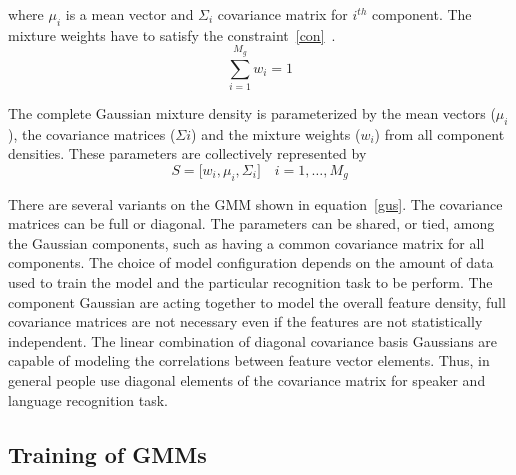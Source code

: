 \begin{spacing}{1.5}
where $\mu_{i}$ is a mean vector and $\Sigma_{i}$ covariance matrix for $i^{th}$ component. The mixture weights have to satisfy the constraint~\ref{con}~\cite{reynolds1995speaker}.
\begin{equation}
\label{con}
 \sum_{i=1}^{M_{g}}w_{i}=1
\end{equation}
 
 The complete Gaussian mixture density is parameterized by the mean vectors ($\mu_{i}$), the covariance matrices ($\Sigma{i}$) and the mixture weights ($w_{i}$) from all component densities. These parameters are collectively represented by
\begin{equation}
\label{gus}
 S= \bigg[w_{i},\mu_{i}, \Sigma_{i} \bigg] \quad i=1,\ldots, M_{g}
\end{equation}

There are several variants on the GMM shown in equation~\ref{gus}. The covariance matrices can be full or diagonal. The parameters can be shared, or tied, among the Gaussian components, such as having a common covariance matrix for all components. The choice of model configuration depends on the amount of data used to train the model and the particular recognition task to be perform. The component Gaussian are acting together to model the overall feature density, full covariance matrices are not necessary even if the features are not statistically independent. The linear combination of diagonal covariance basis Gaussians are capable of modeling the correlations between feature vector elements. Thus, in general people use diagonal elements of the covariance matrix for speaker and language recognition task.  





\subsection{Training of GMMs}


\end{spacing}
